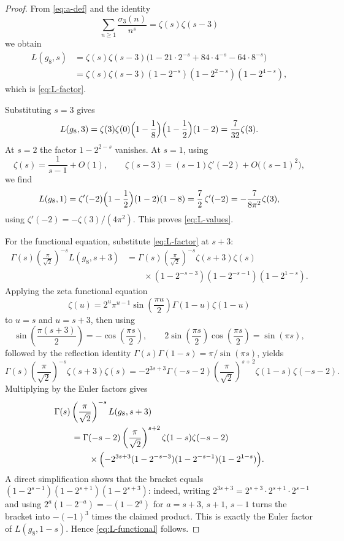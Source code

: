 \documentclass[11pt]{amsart}
\numberwithin{equation}{section}
\theoremstyle{plain}
\theoremstyle{definition}
\theoremstyle{remark}
\newcommand{\sigthree}{\sigma_3}
\begin{document}
\begin{proof}
From \eqref{eq:a-def} and the identity
\[
\sum_{n\ge 1}\frac{\sigthree(n)}{n^s}=\zeta(s)\zeta(s-3)
\]
we obtain
\begin{align*}
L(g_8,s)
&=\zeta(s)\zeta(s-3)\bigl(1-21\cdot 2^{-s}+84\cdot 4^{-s}-64\cdot 8^{-s}\bigr)\\
&=\zeta(s)\zeta(s-3)(1-2^{-s})(1-2^{2-s})(1-2^{4-s}),
\end{align*}
which is \eqref{eq:L-factor}.

Substituting $s=3$ gives
\[
L(g_8,3)=\zeta(3)\zeta(0)\Bigl(1-\frac18\Bigr)\Bigl(1-\frac12\Bigr)(1-2)=\frac{7}{32}\zeta(3).
\]
At $s=2$ the factor $1-2^{2-s}$ vanishes. At $s=1$, using
\[
\zeta(s)=\frac{1}{s-1}+O(1),
\qquad
\zeta(s-3)=(s-1)\zeta'(-2)+O\bigl((s-1)^2\bigr),
\]
we find
\[
L(g_8,1)=\zeta'(-2)\Bigl(1-\frac12\Bigr)(1-2)(1-8)
=\frac72\,\zeta'(-2)=-\frac{7}{8\pi^2}\zeta(3),
\]
using $\zeta'(-2)=-\zeta(3)/(4\pi^2)$. This proves \eqref{eq:L-values}.

For the functional equation, substitute \eqref{eq:L-factor} at $s+3$:
\begin{align*}
\Gamma(s)\left(\frac{\pi}{\sqrt2}\right)^{-s}L(g_8,s+3)
&=\Gamma(s)\left(\frac{\pi}{\sqrt2}\right)^{-s}\zeta(s+3)\zeta(s)\\
&\qquad\times(1-2^{-s-3})(1-2^{-s-1})(1-2^{1-s}).
\end{align*}
Applying the zeta functional equation
\[
\zeta(u)=2^u\pi^{u-1}\sin\!\left(\frac{\pi u}{2}\right)\Gamma(1-u)\zeta(1-u)
\]
to $u=s$ and $u=s+3$, then using
\[
\sin\!\left(\frac{\pi(s+3)}{2}\right)=-\cos\!\left(\frac{\pi s}{2}\right),
\qquad
2\sin\!\left(\frac{\pi s}{2}\right)\cos\!\left(\frac{\pi s}{2}\right)=\sin(\pi s),
\]
followed by the reflection identity $\Gamma(s)\Gamma(1-s)=\pi/\sin(\pi s)$, yields
\[
\Gamma(s)\left(\frac{\pi}{\sqrt2}\right)^{-s}\zeta(s+3)\zeta(s)
=-2^{3s+3}\Gamma(-s-2)\left(\frac{\pi}{\sqrt2}\right)^{s+2}\zeta(1-s)\zeta(-s-2).
\]
Multiplying by the Euler factors gives
\begin{align*}
&\Gamma(s)\left(\frac{\pi}{\sqrt2}\right)^{-s}L(g_8,s+3)\\
&\qquad=\Gamma(-s-2)\left(\frac{\pi}{\sqrt2}\right)^{s+2}\zeta(1-s)\zeta(-s-2)\\
&\qquad\qquad\times\Bigl(-2^{3s+3}(1-2^{-s-3})(1-2^{-s-1})(1-2^{1-s})\Bigr).
\end{align*}
A direct simplification shows that the bracket equals
$(1-2^{s-1})(1-2^{s+1})(1-2^{s+3})$: indeed, writing
$2^{3s+3}=2^{s+3}\cdot 2^{s+1}\cdot 2^{s-1}$ and using $2^a(1-2^{-a})=-(1-2^a)$
for $a=s+3$, $s+1$, $s-1$ turns the bracket into $-(-1)^3$ times the claimed product.
This is exactly the Euler factor of $L(g_8,1-s)$. Hence \eqref{eq:L-functional} follows.
\end{proof}
\end{document}
